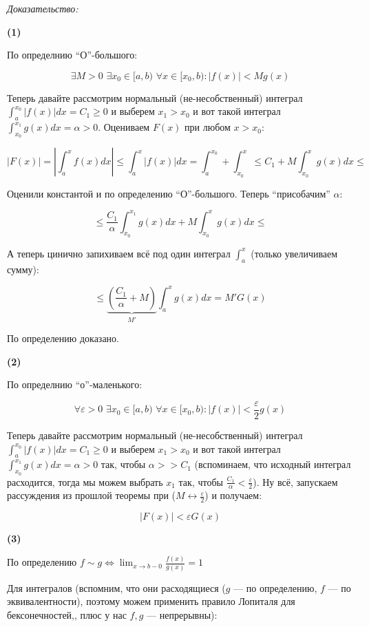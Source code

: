 \documentclass{article}
\def\dbl{\,\,}
\begin{document}
\textit{Доказательство:}

\textbf{(1)}

По определнию ``О''-большого: 

\[\exists M > 0 \dbl \exists x_0 \in [a, b) \dbl \forall x \in [x_0, b): |f(x)| < Mg(x) \]

Теперь давайте рассмотрим нормальный (не-несобственный) интеграл $\int_a^{x_0} |f(x)| dx = C_1 \ge 0$ и выберем $x_1 > x_0$ и вот такой интеграл $\int_{x_0}^{x_1} g(x) dx = \alpha > 0$. Оцениваем $F(x)$ при любом $x > x_0$:

\[|F(x)| = \left|\int_a^x f(x) dx\right| \le \int_a^x |f(x)| dx = \int_a^{x_0} + \int_{x_0}^{x} \le C_1 + M\int_{x_0}^x g(x) dx \le \]

Оценили константой и по определению ``О''-большого. Теперь ``присобачим'' $\alpha$:

\[\le \frac{C_1}{\alpha} \int_{x_0}^{x_1}g(x) dx + M\int_{x_0}^x g(x) dx \le \]

А теперь цинично запихиваем всё под один интеграл $\int_a^x$ (только увеличиваем сумму):

\[\le \underbrace{\left(\frac{C_1}{\alpha} + M\right)}_{M'} \int_{a}^x g(x) dx = M'G(x)\]

По определению доказано.

\textbf{(2)}

По определнию ``о''-маленького: 

\[\forall \varepsilon > 0 \dbl \exists x_0 \in [a, b) \dbl \forall x \in [x_0, b): |f(x)| < \frac{\varepsilon}{2}g(x) \]

Теперь давайте рассмотрим нормальный (не-несобственный) интеграл $\int_a^{x_0} |f(x)| dx = C_1 \ge 0$ и выберем $x_1 > x_0$ и вот такой интеграл $\int_{x_0}^{x_1} g(x) dx = \alpha > 0$ так, чтобы $\alpha >> C_1$ (вспоминаем, что исходный интеграл расходится, тогда мы можем выбрать $x_1$ так, чтобы $\frac{C_1}{\alpha} < \frac{\varepsilon}{2}$). Ну всё, запускаем рассуждения из прошлой теоремы при ($M \leftrightarrow \frac{\varepsilon}{2}$) и получаем:

\[|F(x)| < \varepsilon G(x)\]

\textbf{(3)}

По определению $f \sim g \Leftrightarrow \lim_{x \rightarrow b - 0} \frac{f(x)}{g(x)} = 1$

Для интегралов (вспомним, что они расходящиеся ($g$ --- по определению, $f$ --- по эквивалентности), поэтому можем применить правило Лопиталя для бексонечностей,, плюс у нас $f, g$ --- непрерывны):
\end{document}
